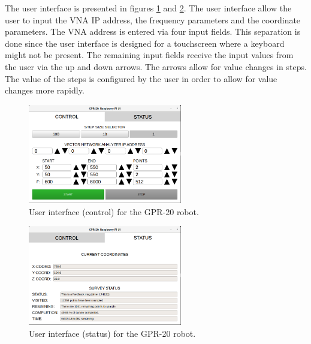 \documentclass{article}
\begin{document}
The user interface is presented in figures \ref{fig:ui_img_control} and \ref{fig:ui_img_status}. The user interface allow the user to input the VNA IP address, the frequency parameters and the coordinate parameters. The VNA address is entered via four input fields. This separation is done since the user interface is designed for a touchscreen where a keyboard might not be present. The remaining input fields receive the input values from the user via the up and down arrows. The arrows allow for value changes in steps. The value of the steps is configured by the user in order to allow for value changes more rapidly.

\begin{figure}[h]
    \centering
    \includegraphics[width=0.6\textwidth]{images/software/UI_control.png}
    \caption{User interface (control) for the GPR-20 robot.}
    \label{fig:ui_img_control}
\end{figure}

\begin{figure}[h]
    \centering
    \includegraphics[width=0.6\textwidth]{images/software/UI_status.png}
    \caption{User interface (status) for the GPR-20 robot.}
    \label{fig:ui_img_status}
\end{figure}
\end{document}
